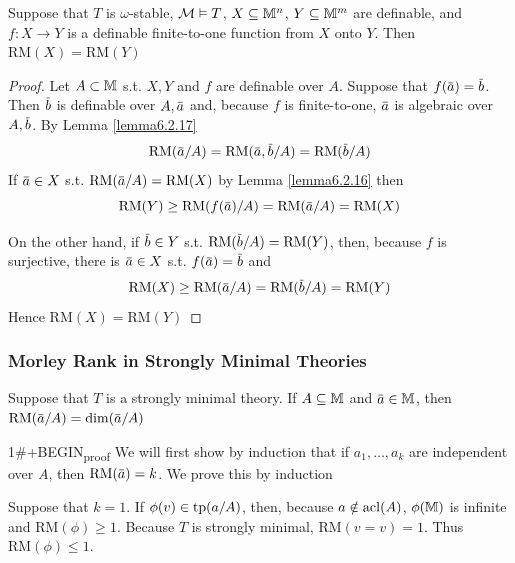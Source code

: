 \documentclass[11pt]{article}
\def \RM {\text{RM}}
\begin{document}
\begin{corollary}[]
Suppose that \(T\) is \(\omega\)-stable, \(\mathcal{M}\vDash T\), \(X\subseteq\mathbb{M}^n\), \(Y\subseteq\mathbb{M}^m\) are definable, and \(f:X\to Y\) is a
definable finite-to-one function from \(X\) onto \(Y\). Then \(\RM(X)=\RM(Y)\)
\end{corollary}

\begin{proof}
Let \(A\subset\mathbb{M}\) s.t. \(X,Y\) and \(f\) are definable over \(A\). Suppose that \(f(\bara)=\barb\).
Then \(\barb\) is definable over \(A,\bara\) and, because \(f\) is finite-to-one, \(\bara\) is
algebraic over \(A,\barb\). By Lemma \ref{lemma6.2.17}
\begin{equation*}
\RM(\bara/A)=\RM(\bara,\barb/A)=\RM(\barb/A)
\end{equation*}
If \(\bara\in X\) s.t. \(\RM(\bara/A)=\RM(X)\) by Lemma \ref{lemma6.2.16} then
\begin{equation*}
\RM(Y)\ge\RM(f(\bara)/A)=\RM(\bara/A)=\RM(X)
\end{equation*}

On the other hand, if \(\barb\in Y\) s.t. \(\RM(\barb/A)=\RM(Y)\), then, because \(f\) is
surjective, there is \(\bara\in X\) s.t. \(f(\bara)=\barb\) and
\begin{equation*}
\RM(X)\ge\RM(\bara/A)=\RM(\barb/A)=\RM(Y)
\end{equation*}
Hence \(\RM(X)=\RM(Y)\)
\end{proof}
\subsubsection{Morley Rank in Strongly Minimal Theories}
\label{sec:orgfacb491}
\begin{theorem}[]
Suppose that \(T\) is a strongly minimal theory. If \(A\subseteq\mathbb{M}\) and \(\bara\in\M\), then \(\RM(\bara/A)=\dim(\bara/A)\)
\end{theorem}

1\#+BEGIN\textsubscript{proof}
We will first show by induction that if \(a_1,\dots,a_k\) are independent over \(A\),
then \(\RM(\bara)=k\). We prove this by induction

Suppose that \(k=1\). If \(\phi(v)\in\operatorname{tp}(a/A)\), then, because \(a\notin\operatorname{acl}(A)\), \(\phi(\mathbb{M})\) is infinite
and \(\RM(\phi)\ge 1\). Because \(T\) is strongly minimal, \(\RM(v=v)=1\). Thus \(\RM(\phi)\le 1\).
\end{document}
